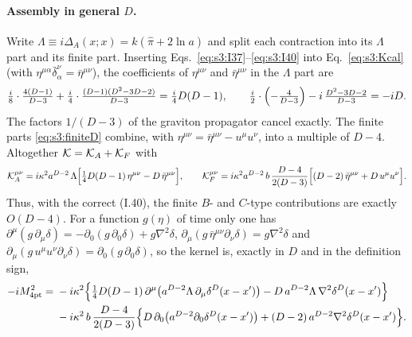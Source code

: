 \documentclass[aps,prd,onecolumn,10pt,nofootinbib,floatfix]{revtex4-2}
\newcommand{\eqI}[1]{(I.#1)}
\newcommand{\pihat}{\hat\pi}
\begin{document}
\paragraph*{Assembly in general $D$.}
Write $\Lambda\equiv i\Delta_A(x;x)=k(\pihat+2\ln a)$ and split each contraction into its
$\Lambda$ part and its finite part. Inserting Eqs.~\eqref{eq:s3:I37}--\eqref{eq:s3:I40} into
Eq.~\eqref{eq:s3:Kcal} (with $\eta^{\mu\alpha}\bar\delta^\nu_\alpha=\bar\eta^{\mu\nu}$), the
coefficients of $\eta^{\mu\nu}$ and $\bar\eta^{\mu\nu}$ in the $\Lambda$ part are
\begin{equation}\label{eq:s3:coefA}
\tfrac i8\cdot\tfrac{4(D-1)}{D-3}+\tfrac i4\cdot\tfrac{(D-1)(D^2-3D-2)}{D-3}=\tfrac i4D(D-1),\qquad
\tfrac i2\cdot\Bigl(-\tfrac4{D-3}\Bigr)-i\,\tfrac{D^2-3D-2}{D-3}=-iD .
\end{equation}
The factors $1/(D-3)$ of the graviton propagator cancel exactly. The finite parts
\eqref{eq:s3:finiteD} combine, with $\eta^{\mu\nu}=\bar\eta^{\mu\nu}-u^\mu u^\nu$, into a
multiple of $D-4$. Altogether $\mathcal K=\mathcal K_A+\mathcal K_F$ with
\begin{equation}\label{eq:s3:KAKF}
\mathcal K^{\mu\nu}_A=i\kappa^2a^{D-2}\,\Lambda\Bigl[\tfrac14D(D-1)\,\eta^{\mu\nu}-D\,\bar\eta^{\mu\nu}\Bigr],
\qquad
\mathcal K^{\mu\nu}_F=i\kappa^2a^{D-2}\,b\,\frac{D-4}{2(D-3)}\Bigl[(D-2)\,\bar\eta^{\mu\nu}+D\,u^\mu u^\nu\Bigr].
\end{equation}
Thus, with the correct \eqI{40}, the finite $B$- and $C$-type contributions are exactly
$O(D-4)$. For a function $g(\eta)$ of time only one has
$\partial^\mu(g\,\partial_\mu\delta)=-\partial_0(g\,\partial_0\delta)+g\nabla^2\delta$,
$\partial_\mu(g\,\bar\eta^{\mu\nu}\partial_\nu\delta)=g\nabla^2\delta$ and
$\partial_\mu(g\,u^\mu u^\nu\partial_\nu\delta)=\partial_0(g\,\partial_0\delta)$, so the kernel is,
exactly in $D$ and in the definition sign,
\begin{equation}\label{eq:s3:kernelD}
\begin{aligned}
-iM^2_{\rm 4pt}={}&-i\kappa^2\Bigl\{\tfrac14D(D-1)\,\partial^\mu\bigl(a^{D-2}\Lambda\,\partial_\mu\delta^D(x-x')\bigr)
-D\,a^{D-2}\Lambda\,\nabla^2\delta^D(x-x')\Bigr\}\\
&-i\kappa^2\,b\,\frac{D-4}{2(D-3)}\Bigl\{D\,\partial_0\bigl(a^{D-2}\partial_0\delta^D(x-x')\bigr)
+(D-2)\,a^{D-2}\nabla^2\delta^D(x-x')\Bigr\}.
\end{aligned}
\end{equation}
\end{document}

